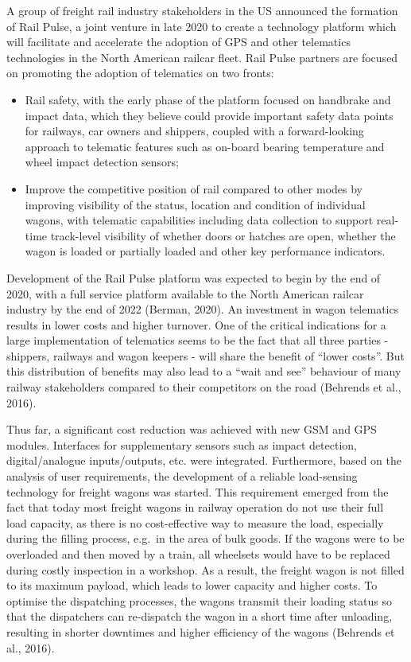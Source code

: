 \documentclass[
]{book}
\providecommand{\tightlist}{%
  \setlength{\itemsep}{0pt}\setlength{\parskip}{0pt}}
\begin{document}
A group of freight rail industry stakeholders in the US announced the formation of Rail Pulse, a joint venture in late 2020 to create a technology platform which will facilitate and accelerate the adoption of GPS and other telematics technologies in the North American railcar fleet. Rail Pulse partners are focused on promoting the adoption of telematics on two fronts:

\begin{itemize}
\tightlist
\item
  Rail safety, with the early phase of the platform focused on handbrake and impact data, which they believe could provide important safety data points for railways, car owners and shippers, coupled with a forward-looking approach to telematic features such as on-board bearing temperature and wheel impact detection sensors;
\item
  Improve the competitive position of rail compared to other modes by improving visibility of the status, location and condition of individual wagons, with telematic capabilities including data collection to support real-time track-level visibility of whether doors or hatches are open, whether the wagon is loaded or partially loaded and other key performance indicators.
\end{itemize}

Development of the Rail Pulse platform was expected to begin by the end of 2020, with a full service platform available to the North American railcar industry by the end of 2022 (Berman, 2020).
An investment in wagon telematics results in lower costs and higher turnover. One of the critical indications for a large implementation of telematics seems to be the fact that all three parties - shippers, railways and wagon keepers - will share the benefit of ``lower costs''. But this distribution of benefits may also lead to a ``wait and see'' behaviour of many railway stakeholders compared to their competitors on the road (Behrends et al., 2016).

Thus far, a significant cost reduction was achieved with new GSM and GPS modules. Interfaces for supplementary sensors such as impact detection, digital/analogue inputs/outputs, etc. were integrated. Furthermore, based on the analysis of user requirements, the development of a reliable load-sensing technology for freight wagons was started. This requirement emerged from the fact that today most freight wagons in railway operation do not use their full load capacity, as there is no cost-effective way to measure the load, especially during the filling process, e.g.~in the area of bulk goods. If the wagons were to be overloaded and then moved by a train, all wheelsets would have to be replaced during costly inspection in a workshop. As a result, the freight wagon is not filled to its maximum payload, which leads to lower capacity and higher costs. To optimise the dispatching processes, the wagons transmit their loading status so that the dispatchers can re-dispatch the wagon in a short time after unloading, resulting in shorter downtimes and higher efficiency of the wagons (Behrends et al., 2016).
\end{document}
